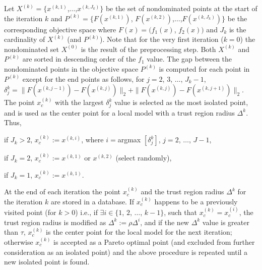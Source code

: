 \smallskip

\noindent Let $X^{(k)} = \bigl\{x^{(k,1)}$,$\ldots$,$x^{(k,J_k)}\bigr\}$ be the 
set of nondominated points at the start of the iteration $k$ and 
$P^{(k)} = \bigl\{F(x^{(k,1)})$, $F(x^{(k,2)})$,$\ldots$,$F(x^{(k,J_k)})\bigr
\}$ be the corresponding objective space where $F(x) = \bigl (f_1(x)$, 
$f_2(x)\bigr )$ and $J_{k}$ is the cardinality of $X^{(k)}$ (and $P^{(k)}$). 
Note that for the very first iteration ($k=0$) the nondominated set $X^{(0)}$ 
is the result of the preprocessing step. Both $X^{(k)}$ and $P^{(k)}$ are 
sorted in descending order of the $f_1$ value. The gap between the nondominated 
points in the objective space $P^{(k)}$ is computed for each point in $P^{(k)}$ 
except for the end points as follows, for $j=2$, $3$, $\ldots$, $J_{k}-1$, 
$\delta_j^k=\|F(x^{(k,j-1)})-F(x^{(k,j)})\|_2 + \|F(x^{(k,j)})-F(x^{(k,j+1)})
\|_2$. The point $x_c^{(k)}$ with the largest $\delta_j^k$ 
value is selected as the most isolated point, and is used as the center point 
for a local model with a trust region radius $\Delta^k$. Thus,

\noindent if $J_k > 2$, $x_c^{(k)} := x^{(k,i)}$, where $i=$\hbox{argmax}
$[\delta_j^k]$, $j=2$, $\ldots$, $J-1$,

\noindent if $J_k = 2$,  $x_c^{(k)} := x^{(k,1)}$ or $x^{(k,2)}$ (select 
randomly),

\noindent if $J_k = 1$, $x_c^{(k)} := x^{(k,1)}$.

At the end of each iteration the point $x_c^{(k)}$ and the trust region radius 
$\Delta^k$ for the iteration $k$ are stored in a database. If $x_c^{(k)}$ 
happens to be a previously visited point (for $k > 0$) i.e., if $\exists 
i\in\{1$, $2$, $\ldots$, $k-1\}$, such that $x_c^{(k)} = x_c^{(i)}$, the trust 
region radius is modified as $\Delta^k := \rho\Delta^i$, and if the new 
$\Delta^k$ value is greater than $\tau$, $x_c^{(k)}$ is the center point for 
the local model for the next iteration; otherwise $x_c^{(k)}$ is accepted as a 
Pareto optimal point (and excluded from further consideration as an isolated 
point) and the above procedure is repeated until a new isolated point is 
found.\smallskip

\smallskip

